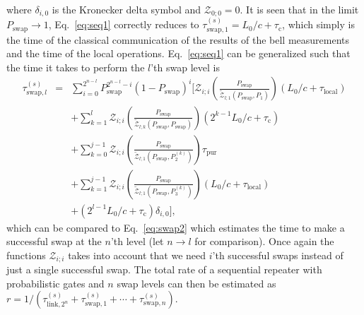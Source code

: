 where $\delta_{i,0}$ is the Kronecker delta symbol and $\mathcal{Z}_{0;0}=0$. It
is seen that in the limit $P_{\text{swap}}\to1$, Eq.~\eqref{eq:seq1} correctly
reduces to $\tau^{(s)}_{\text{swap},1}=L_{0}/c+\tau_{\text{c}}$, which simply is
the time of the classical communication of the results of the bell measurements
and the time of the local operations. Eq.~\eqref{eq:seq1} can be generalized
such that the time it takes to perform the $l$'th swap level is
\begin{eqnarray}
\tau^{(s)}_{\text{swap},l}&=&\sum_{i=0}^{2^{n-l}}
P_{\text{swap}}^{2^{n-l}-i}(1-P_{\text{swap}})^{i}\Bigg[ 
\mathcal{Z}_{i;i}\left(\!\frac{
P_{\text{swap}}}{\tilde{\mathcal{Z}}_{l;1}(
P_{\text{swap}},P_{1})\!}\right)(L_{0}/c+\tau_{\text{local}}) \nonumber \\
&&+\sum_{k=1}^{l}\mathcal{Z}_{i;i}\!\left(\frac{
P_{\text{swap}}}{\tilde{\mathcal{Z}}_{l;k}(P_{\text{swap}},
P_{\text{swap}})}\right)\!(2^{k\!-\!1}L_{0}/c+\tau_{\text{c}}) \nonumber \\
&&+\sum_{k=0}^{j-1}\mathcal{Z}_{i;i}\left(\frac{
P_{\text{swap}}}{\tilde{\mathcal{Z}}_{l;1}(P_{\text{swap}},
P_{2}^{(k)})}\right)\tau_{\text{pur}} \nonumber \\
&&+\sum_{k=1}^{j-1}\mathcal{Z}_{i;i}\left(\frac{
P_{\text{swap}}}{\tilde{\mathcal{Z}}_{l;1}(P_{\text{swap}},
P_{3}^{(k)})}\right)(L_{0}/c+\tau_{\text{local}}) \nonumber \\
&&+(2^{l-1}L_{0}/c+\tau_{\text{c}})\delta_{i,0} \Bigg],
\end{eqnarray} 
which can be compared to Eq.~\eqref{eq:swap2} which estimates the time to make a
successful swap at the $n$'th level (let $n\to l$ for comparison). Once again
the functions $\mathcal{Z}_{i;i}$ takes into account that we need $i$'th
successful swaps instead of just a single successful swap. The total rate of a
sequential repeater with probabilistic gates and $n$ swap levels can then be
estimated as
$r=1/(\tau^{(s)}_{\text{link},2^{n}}+\tau^{(s)}_{\text{swap},1}
+\cdots+\tau^{(s)}_{\text{swap},n})$.
